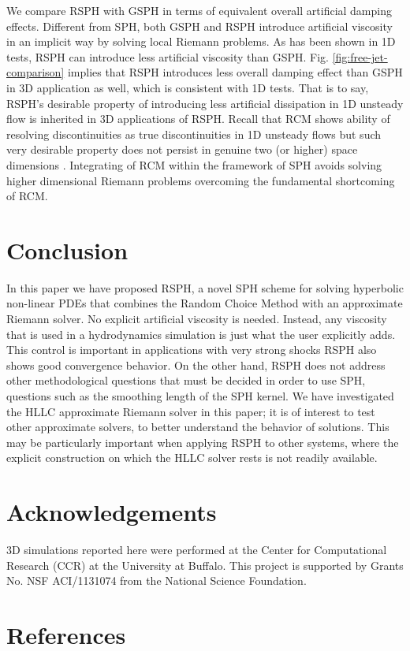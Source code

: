 \documentclass[review]{elsarticle}
\begin{document}
We compare RSPH with GSPH in terms of equivalent overall artificial damping effects. Different from SPH, both GSPH and RSPH introduce artificial viscosity in an implicit way by solving local Riemann problems. As has been shown in 1D tests, RSPH can introduce less artificial viscosity than GSPH. Fig. \ref{fig:free-jet-comparison} implies that RSPH introduces less overall damping effect than GSPH in 3D application as well, which is consistent with 1D tests. That is to say, RSPH's desirable property of introducing less artificial dissipation in 1D unsteady flow is inherited in 3D applications of RSPH. Recall that RCM shows ability of resolving discontinuities as true discontinuities in 1D unsteady flows but such very desirable property does not persist in genuine two (or higher) space dimensions \citep{colella1982glimm}. Integrating of RCM within the framework of SPH avoids solving higher dimensional Riemann problems overcoming the fundamental shortcoming of RCM.

\section{Conclusion}
In this paper we have proposed RSPH, a novel SPH scheme for solving hyperbolic non-linear PDEs that combines the Random Choice Method with
an approximate Riemann solver.  No explicit artificial viscosity is needed. Instead, any viscosity that is used in a hydrodynamics simulation 
is just what the user explicitly adds. This control is important in applications with very strong shocks
RSPH also shows good convergence behavior.
On the other hand, RSPH does not address other methodological questions that must be decided in order to use SPH, 
questions such as the smoothing length of the SPH kernel. We have investigated the HLLC approximate Riemann solver in this paper;
it is of interest to test other approximate solvers,  to better understand the behavior of solutions.
This may be particularly important when applying RSPH to other systems, where the explicit construction on which the HLLC solver
rests is not readily available.


\section*{Acknowledgements}
3D simulations reported here were performed at the Center for Computational Research (CCR) at the University at Buffalo. This project is supported by Grants No. NSF ACI/1131074 from the National Science Foundation.

\section*{References}


\end{document}
